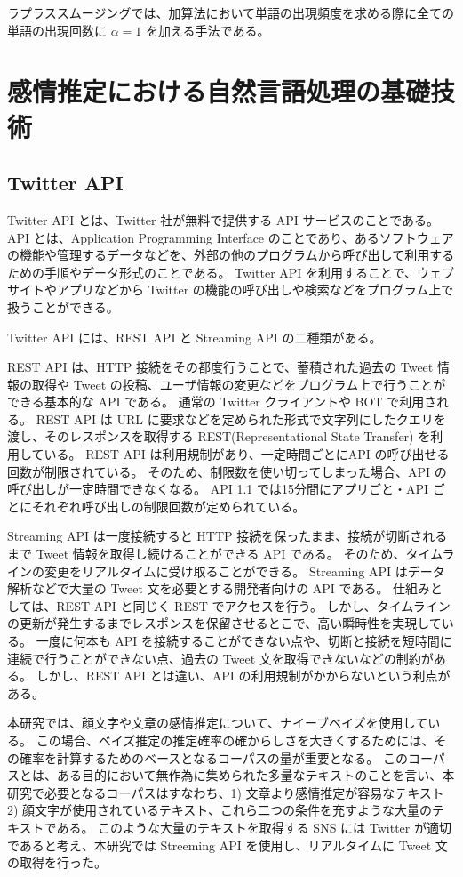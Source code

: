 \documentclass[11pt,a4j]{jsarticle}
\begin{document}
ラプラススムージングでは、加算法において単語の出現頻度を求める際に全ての単語の出現回数に $\alpha=1$ を加える手法である。
 
\section{感情推定における自然言語処理の基礎技術}
\subsection{Twitter API}
 Twitter API とは、Twitter 社が無料で提供する API サービスのことである。
API とは、Application Programming Interface のことであり、あるソフトウェアの機能や管理するデータなどを、外部の他のプログラムから呼び出して利用するための手順やデータ形式のことである。
Twitter API を利用することで、ウェブサイトやアプリなどから Twitter の機能の呼び出しや検索などをプログラム上で扱うことができる。

Twitter API には、REST API と Streaming API の二種類がある。

REST API は、HTTP 接続をその都度行うことで、蓄積された過去の Tweet 情報の取得や Tweet の投稿、ユーザ情報の変更などをプログラム上で行うことができる基本的な API である。
通常の Twitter クライアントや BOT で利用される。
REST API は URL に要求などを定められた形式で文字列にしたクエリを渡し、そのレスポンスを取得する REST(Representational State Transfer) を利用している。
REST API は利用規制があり、一定時間ごとにAPI の呼び出せる回数が制限されている。
そのため、制限数を使い切ってしまった場合、API の呼び出しが一定時間できなくなる。
API 1.1 では15分間にアプリごと・API ごとにそれぞれ呼び出しの制限回数が定められている。

Streaming API は一度接続すると HTTP 接続を保ったまま、接続が切断されるまで Tweet 情報を取得し続けることができる API である。
そのため、タイムラインの変更をリアルタイムに受け取ることができる。
Streaming API はデータ解析などで大量の Tweet 文を必要とする開発者向けの API である。
仕組みとしては、REST API と同じく REST でアクセスを行う。
しかし、タイムラインの更新が発生するまでレスポンスを保留させるとこで、高い瞬時性を実現している。
一度に何本も API を接続することができない点や、切断と接続を短時間に連続で行うことができない点、過去の Tweet 文を取得できないなどの制約がある。
しかし、REST API とは違い、API の利用規制がかからないという利点がある。

本研究では、顔文字や文章の感情推定について、ナイーブベイズを使用している。
この場合、ベイズ推定の推定確率の確からしさを大きくするためには、その確率を計算するためのベースとなるコーパスの量が重要となる。
このコーパスとは、ある目的において無作為に集められた多量なテキストのことを言い、本研究で必要となるコーパスはすなわち、1) 文章より感情推定が容易なテキスト 2) 顔文字が使用されているテキスト、これら二つの条件を充すような大量のテキストである。
このような大量のテキストを取得する SNS には Twitter が適切であると考え、本研究では Streeming API を使用し、リアルタイムに Tweet 文の取得を行った。
\end{document}
